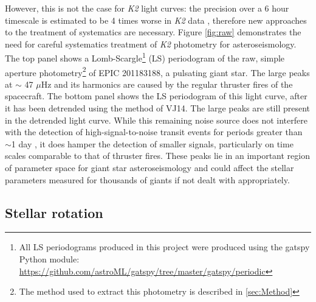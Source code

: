 \documentclass[useAMS, usenatbib, preprint, 12pt]{aastex}
\begin{document}
However, this is not the case for {\it K2} light curves: the precision over a
6 hour timescale is estimated to be 4 times worse in {\it K2} data
\citep{Howell2014}, therefore new approaches to the treatment of systematics
are necessary.
Figure \ref{fig:raw} demonstrates the need for careful systematics treatment
of {\it K2} photometry for asteroseismology.
The top panel shows a Lomb-Scargle\footnote{All LS periodograms
produced in this project were produced using the gatspy Python module:
\url{https://github.com/astroML/gatspy/tree/master/gatspy/periodic}} (LS)
periodogram of the raw, simple aperture photometry\footnote{The method used to
extract this photometry is described in \textsection \ref{sec:Method}} of EPIC
201183188, a pulsating giant star.
The large peaks at $\sim$ 47 $\mu$Hz and its harmonics are caused by the
regular thruster fires of the spacecraft.
The bottom panel shows the LS periodogram of this light curve, after
it has been detrended using the method of VJ14.
The large peaks are still present in the detrended light curve.
While this remaining noise source does not interfere with the detection of
high-signal-to-noise transit events for periods greater than $\sim$1 day
\citep{Vanderburg2015}, it does hamper the detection of
smaller signals, particularly on time scales comparable to that of thruster
fires.
These peaks lie in an important region of parameter space for giant star
asteroseismology and could affect the stellar parameters measured for thousands
of giants if not dealt with appropriately.

\subsection{Stellar rotation}
\end{document}
